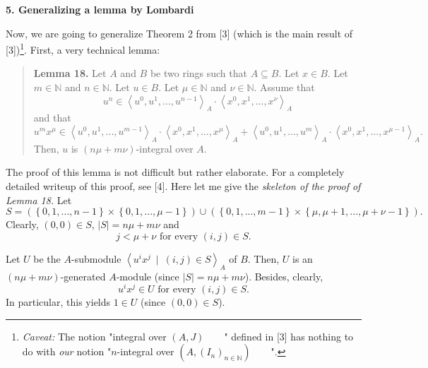 \documentclass[12pt,final,notitlepage,onecolumn]{article}%
\begin{document}
\begin{center}
\color{blue} \textbf{5. Generalizing a lemma by Lombardi} \color{black}
\end{center}

Now, we are going to generalize Theorem 2 from [3] (which is the main result
of [3])\footnote{\textit{Caveat:} The notion "integral over $\left(
A,J\right)  $\ \ \ \ " defined in [3] has nothing to do with \textit{our}
notion "$n$-integral over $\left(  A,\left(  I_{n}\right)  _{n\in\mathbb{N}%
}\right)  $\ \ \ \ ".}. First, a very technical lemma:

\begin{quote}
\textbf{Lemma 18.} Let $A$ and $B$ be two rings such that $A\subseteq B$. Let
$x\in B$. Let $m\in\mathbb{N}$ and $n\in\mathbb{N}$. Let $u\in B$. Let $\mu
\in\mathbb{N}$ and $\nu\in\mathbb{N}$. Assume that%
\begin{equation}
u^{n}\in\left\langle u^{0},u^{1},...,u^{n-1}\right\rangle _{A}\cdot
\left\langle x^{0},x^{1},...,x^{\nu}\right\rangle _{A} \label{L18-1}%
\end{equation}
and that%
\begin{equation}
u^{m}x^{\mu}\in\left\langle u^{0},u^{1},...,u^{m-1}\right\rangle _{A}%
\cdot\left\langle x^{0},x^{1},...,x^{\mu}\right\rangle _{A}+\left\langle
u^{0},u^{1},...,u^{m}\right\rangle _{A}\cdot\left\langle x^{0},x^{1}%
,...,x^{\mu-1}\right\rangle _{A}. \label{L18-2}%
\end{equation}
Then, $u$ is $\left(  n\mu+m\nu\right)  $-integral over $A$.
\end{quote}

The proof of this lemma is not difficult but rather elaborate. For a
completely detailed writeup of this proof, see [4]. Here let me give the
\textit{skeleton of the proof of Lemma 18.} Let%
\[
S=\left(  \left\{  0,1,...,n-1\right\}  \times\left\{  0,1,...,\mu-1\right\}
\right)  \cup\left(  \left\{  0,1,...,m-1\right\}  \times\left\{  \mu
,\mu+1,...,\mu+\nu-1\right\}  \right)  .
\]
Clearly, $\left(  0,0\right)  \in S$, $\left\vert S\right\vert =n\mu+m\nu$ and%
\begin{equation}
j<\mu+\nu\text{ for every }\left(  i,j\right)  \in S. \label{L18-banal}%
\end{equation}


Let $U$ be the $A$-submodule $\left\langle u^{i}x^{j}\ \mid\ \left(
i,j\right)  \in S\right\rangle _{A}$ of $B$. Then, $U$ is an $\left(
n\mu+m\nu\right)  $-generated $A$-module (since $\left\vert S\right\vert
=n\mu+m\nu$). Besides, clearly,
\begin{equation}
u^{i}x^{j}\in U\text{ for every }\left(  i,j\right)  \in S. \label{L18-U}%
\end{equation}
In particular, this yields $1\in U$ (since $\left(  0,0\right)  \in S$).
\end{document}
